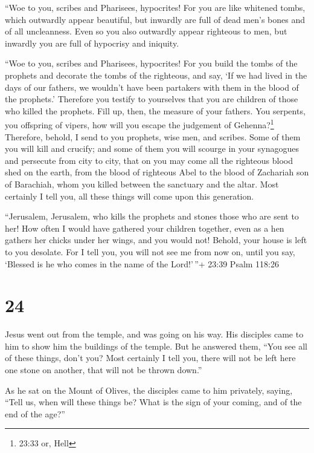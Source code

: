  ``Woe to you, scribes and Pharisees, hypocrites! For you
are like whitened tombs, which outwardly appear beautiful, but inwardly
are full of dead men's bones and of all uncleanness.  Even
so you also outwardly appear righteous to men, but inwardly you are full
of hypocrisy and iniquity.

 ``Woe to you, scribes and Pharisees, hypocrites! For you
build the tombs of the prophets and decorate the tombs of the righteous,
 and say, `If we had lived in the days of our fathers, we
wouldn't have been partakers with them in the blood of the prophets.'
 Therefore you testify to yourselves that you are children
of those who killed the prophets.  Fill up, then, the
measure of your fathers.  You serpents, you offspring of
vipers, how will you escape the judgement of Gehenna?\footnote{23:33 or,
  Hell}  Therefore, behold, I send to you prophets, wise
men, and scribes. Some of them you will kill and crucify; and some of
them you will scourge in your synagogues and persecute from city to
city,  that on you may come all the righteous blood shed on
the earth, from the blood of righteous Abel to the blood of Zachariah
son of Barachiah, whom you killed between the sanctuary and the altar.
 Most certainly I tell you, all these things will come upon
this generation.

 ``Jerusalem, Jerusalem, who kills the prophets and stones
those who are sent to her! How often I would have gathered your children
together, even as a hen gathers her chicks under her wings, and you
would not!  Behold, your house is left to you desolate.
 For I tell you, you will not see me from now on, until you
say, `Blessed is he who comes in the name of the Lord!'\,''+ 23:39 Psalm
118:26

\hypertarget{section-23}{%
\section{24}\label{section-23}}

 Jesus went out from the temple, and was going on his way.
His disciples came to him to show him the buildings of the temple.
 But he answered them, ``You see all of these things, don't
you? Most certainly I tell you, there will not be left here one stone on
another, that will not be thrown down.''

 As he sat on the Mount of Olives, the disciples came to him
privately, saying, ``Tell us, when will these things be? What is the
sign of your coming, and of the end of the age?''

